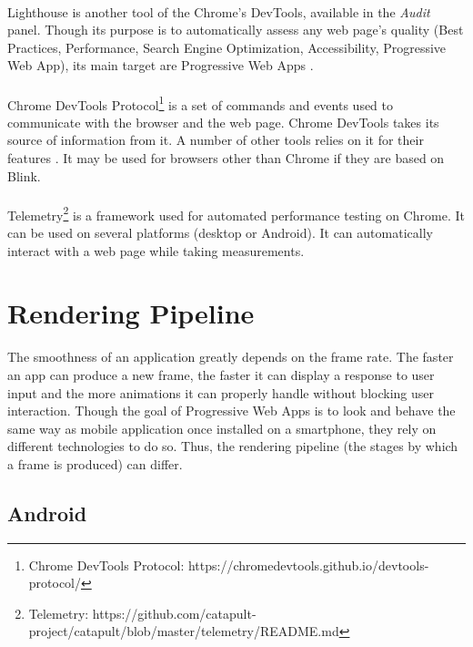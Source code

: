 \documentclass{kththesis}
\begin{document}
\paragraph{}
Lighthouse \cite{lighthouse} is another tool of the Chrome's DevTools, available in the \textit{Audit} panel. Though its purpose is to automatically assess any web page's quality (Best Practices, Performance, Search Engine Optimization, Accessibility, Progressive Web App), its main target are Progressive Web Apps \cite{PWApossibleUnifer}. 

\paragraph{}
Chrome DevTools Protocol\footnote{Chrome DevTools Protocol: https://chromedevtools.github.io/devtools-protocol/} is a set of commands and events used to communicate with the browser and the web page. Chrome DevTools takes its source of information from it. A number of other tools relies on it for their features \cite{awesome_CDP}. It may be used for browsers other than Chrome if they are based on Blink.

\paragraph{}
Telemetry\footnote{Telemetry: https://github.com/catapult-project/catapult/blob/master/telemetry/README.md} is a framework used for automated performance testing on Chrome. It can be used on several platforms (desktop or Android). It can automatically interact with a web page while taking measurements. 

\section{Rendering Pipeline}

The smoothness of an application greatly depends on the frame rate. The faster an app can produce a new frame, the faster it can display a response to user input and the more animations it can properly handle without blocking user interaction. \newline
Though the goal of Progressive Web Apps is to look and behave the same way as mobile application once installed on a smartphone, they rely on different technologies to do so. Thus, the rendering pipeline (the stages by which a frame is produced) can differ.


\subsection{Android} \label{background:pipeline:android}
\end{document}
